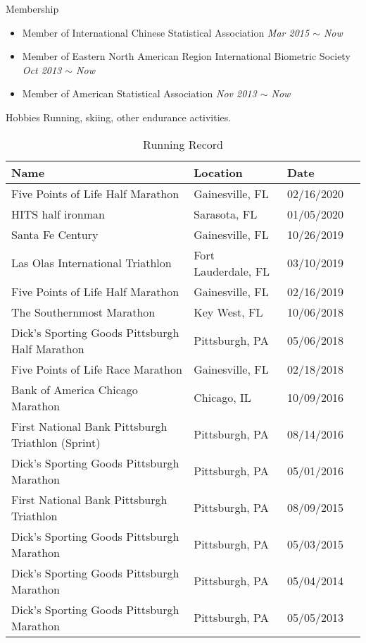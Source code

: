 \documentclass{resume} %
\begin{document}
\begin{rSection}{Membership}
\begin{itemize}[noitemsep,topsep=0pt]
\item Member of International Chinese Statistical Association
        \hfill {\em Mar 2015 $\sim$ Now} 
\item Member of Eastern North American Region International Biometric Society
        \hfill {\em Oct 2013 $\sim$ Now} 
\item Member of American Statistical Association
        \hfill {\em Nov 2013 $\sim$ Now} 
\end{itemize}
\end{rSection}


\begin{rSection}{Hobbies}
Running, skiing, other endurance activities.

\begin{table}[htp]
\caption*{Running Record}
\begin{center}
\begin{tabular}{l l l l}
\hline
\hline
Name & Location  & Date \\
\hline
Five Points of Life Half Marathon & Gainesville, FL &  {02/16/2020} \\
HITS half ironman & Sarasota, FL & 01/05/2020 \\
Santa Fe Century & Gainesville, FL & 10/26/2019 \\
Las Olas International Triathlon & Fort Lauderdale, FL &  {03/10/2019} \\
Five Points of Life Half Marathon & Gainesville, FL &  {02/16/2019} \\
The Southernmost Marathon & Key West, FL &  {10/06/2018}\\
Dick's Sporting Goods Pittsburgh Half Marathon & Pittsburgh, PA &  {05/06/2018}\\
Five Points of Life Race Marathon & Gainesville, FL&   {02/18/2018}\\
Bank of America Chicago Marathon & Chicago, IL&   {10/09/2016}\\
First National Bank Pittsburgh Triathlon (Sprint) & Pittsburgh, PA &   {08/14/2016}\\
Dick's Sporting Goods Pittsburgh Marathon & Pittsburgh, PA&   {05/01/2016} \\
First National Bank Pittsburgh Triathlon & Pittsburgh, PA &  {08/09/2015}\\
Dick's Sporting Goods Pittsburgh Marathon & {Pittsburgh, PA} &  {05/03/2015}\\
Dick's Sporting Goods Pittsburgh Marathon & {Pittsburgh, PA} &    {{05/04/2014}}\\
Dick's Sporting Goods Pittsburgh Marathon & {Pittsburgh, PA} &   {05/05/2013}\\
\hline
\hline
\end{tabular}
\end{center}
\label{default}
\end{table}%


\end{rSection}
\end{document}
